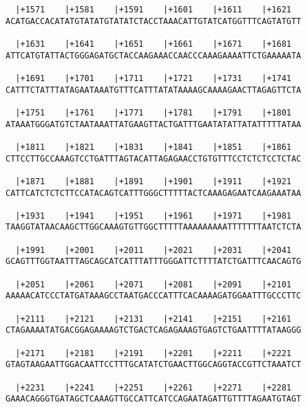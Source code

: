 \documentclass{article}
\begin{document}
\begin{Verbatim}
  |+1571    |+1581    |+1591    |+1601    |+1611    |+1621  
ACATGACCACATATGTATATGTATATCTACCTAAACATTGTATCATGGTTTCAGTATGTT
                                                            
  |+1631    |+1641    |+1651    |+1661    |+1671    |+1681  
ATTCATGTATTACTGGGAGATGCTACCAAGAAACCAACCCAAAGAAAATTCTGAAAAATA
                                                            
  |+1691    |+1701    |+1711    |+1721    |+1731    |+1741  
CATTTCTATTTATAGAATAAATGTTTCATTTATATAAAAGCAAAAGAACTTAGAGTTCTA
                                                            
  |+1751    |+1761    |+1771    |+1781    |+1791    |+1801  
ATAAATGGGATGTCTAATAAATTATGAAGTTACTGATTTGAATATATTATATTTTTATAA
                                                            
  |+1811    |+1821    |+1831    |+1841    |+1851    |+1861  
CTTCCTTGCCAAAGTCCTGATTTAGTACATTAGAGAACCTGTGTTTCCTCTCTCCTCTAC
                                                            
  |+1871    |+1881    |+1891    |+1901    |+1911    |+1921  
CATTCATCTCTCTTCCATACAGTCATTTGGGCTTTTTACTCAAAGAGAATCAAGAAATAA
                                                            
  |+1931    |+1941    |+1951    |+1961    |+1971    |+1981  
TAAGGTATAACAAGCTTGGCAAAGTGTTGGCTTTTTAAAAAAAAATTTTTTTAATCTCTA
                                                            
  |+1991    |+2001    |+2011    |+2021    |+2031    |+2041  
GCAGTTTGGTAATTTAGCAGCATCATTTATTTGGGATTCTTTTATCTGATTTCAACAGTG
                                                            
  |+2051    |+2061    |+2071    |+2081    |+2091    |+2101  
AAAAACATCCCTATGATAAAGCCTAATGACCCATTTCACAAAAGATGGAATTTGCCCTTC
                                                            
  |+2111    |+2121    |+2131    |+2141    |+2151    |+2161  
CTAGAAAATATGACGGAGAAAAGTCTGACTCAGAGAAAGTGAGTCTGAATTTTATAAGGG
                                                            
  |+2171    |+2181    |+2191    |+2201    |+2211    |+2221  
GTAGTAAGAATTGGACAATTCCTTTGCATATCTGAACTTGGCAGGTACCGTTCTAAATCT
                                                            
  |+2231    |+2241    |+2251    |+2261    |+2271    |+2281  
GAAACAGGGTGATAGCTCAAAGTTGCCATTCATCCAGAATAGATTGTTTTAGAATGTAGT
                                                            

\end{Verbatim}
\end{document}
